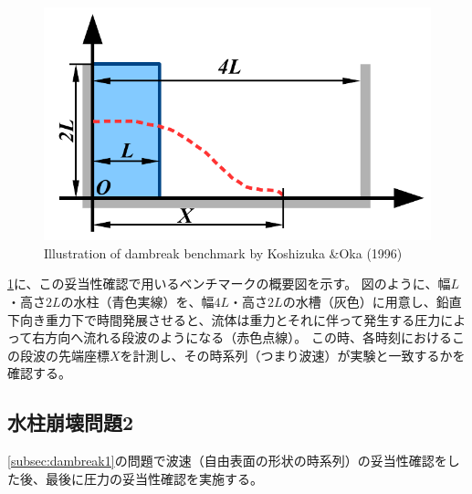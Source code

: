 		\begin{figure} \centering
			\includegraphics[width=\linewidth, clip]{img/dambreak1.pdf}
			\caption{Illustration of dambreak benchmark by Koshizuka \&Oka (1996) \label{fig:dambreak1}}
			\vspace*{-5mm}
		\end{figure}
		\cref{fig:dambreak1}に、この妥当性確認で用いるベンチマークの概要図を示す。
		図のように、幅$L$・高さ$2L$の水柱（青色実線）を、幅$4L$・高さ$2L$の水槽（灰色）に用意し、鉛直下向き重力下で時間発展させると、流体は重力とそれに伴って発生する圧力によって右方向へ流れる段波のようになる（赤色点線）。
		この時、各時刻におけるこの段波の先端座標$X$を計測し、その時系列（つまり波速）が実験と一致するかを確認する。

	\subsection{水柱崩壊問題2 \label{subsec:dambreak2}}
		\cref{subsec:dambreak1}の問題で波速（自由表面の形状の時系列）の妥当性確認をした後、最後に圧力の妥当性確認を実施する。

